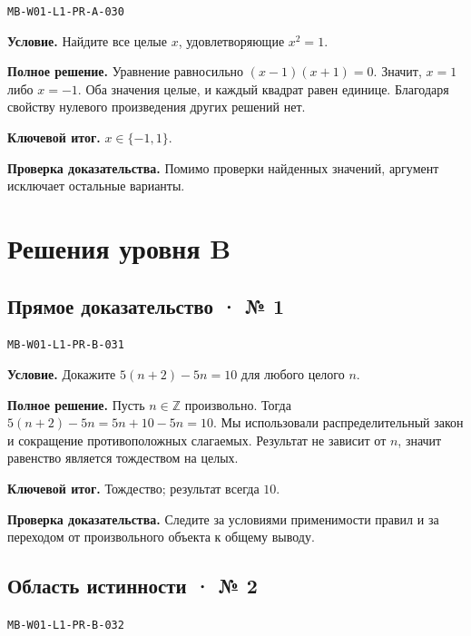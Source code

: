 \documentclass[11pt,a4paper,openany]{book}
\newcommand{\muid}[1]{\texttt{\footnotesize #1}}
\begin{document}
\muid{MB-W01-L1-PR-A-030}\par

\textbf{Условие.} Найдите все целые $x$, удовлетворяющие $x^2=1$.\par

\textbf{Полное решение.} Уравнение равносильно $(x-1)(x+1)=0$. Значит, $x=1$ либо $x=-1$. Оба значения целые, и каждый квадрат равен единице. Благодаря свойству нулевого произведения других решений нет.


\begin{learnbox}\textbf{Ключевой итог.} $x\in\{-1,1\}$.\par \textbf{Проверка доказательства.} 
Помимо проверки найденных значений, аргумент исключает остальные варианты. 
\end{learnbox}

\section{Решения уровня B}

\subsection*{Прямое доказательство · № 1}\hypertarget{solution:MB-W01-L1-PR-B-031}{}

\muid{MB-W01-L1-PR-B-031}\par

\textbf{Условие.} Докажите $5(n+2)-5n=10$ для любого целого $n$.\par

\textbf{Полное решение.} Пусть $n\in\mathbb Z$ произвольно. Тогда $5(n+2)-5n=5n+10-5n=10$. Мы использовали распределительный закон и сокращение противоположных слагаемых. Результат не зависит от $n$, значит равенство является тождеством на целых.


\begin{learnbox}\textbf{Ключевой итог.} Тождество; результат всегда $10$.\par \textbf{Проверка доказательства.} 
Следите за условиями применимости правил и за переходом от произвольного объекта к общему выводу. 
\end{learnbox}

\subsection*{Область истинности · № 2}\hypertarget{solution:MB-W01-L1-PR-B-032}{}

\muid{MB-W01-L1-PR-B-032}\par
\end{document}
